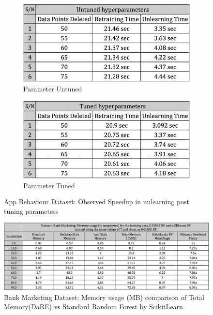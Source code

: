 \documentclass[11pt,letterpaper]{article}
\begin{document}
\begin{figure}[h]
\centering
\begin{subfigure}{.5\textwidth}
  \centering
  \includegraphics[width=.9\linewidth]{tables/Params_Untuned.png}
  \caption{Parameter Untuned}
  \label{fig:sub1}
\end{subfigure}%
\begin{subfigure}{.5\textwidth}
  \centering
  \includegraphics[width=.9\linewidth]{tables/Params_Tuned.png}
  \caption{Parameter Tuned}
  \label{fig:sub2}
\end{subfigure}
\caption{App Behaviour Dataset: Observed Speedup in unlearning post tuning parameters}
\label{fig:paramtuning}
\end{figure}

\begin{figure}[h]
    \centering
    \includegraphics[width=\textwidth]{tables/Memory_Bank_Marketing.png}
    \caption{Bank Marketing Dataset: Memory usage (MB) comparison of Total Memory(DaRE) vs Standard Random Forest by ScikitLearn}
    \label{fig:memusagebankmarketing}
    \end{figure}
\end{document}

